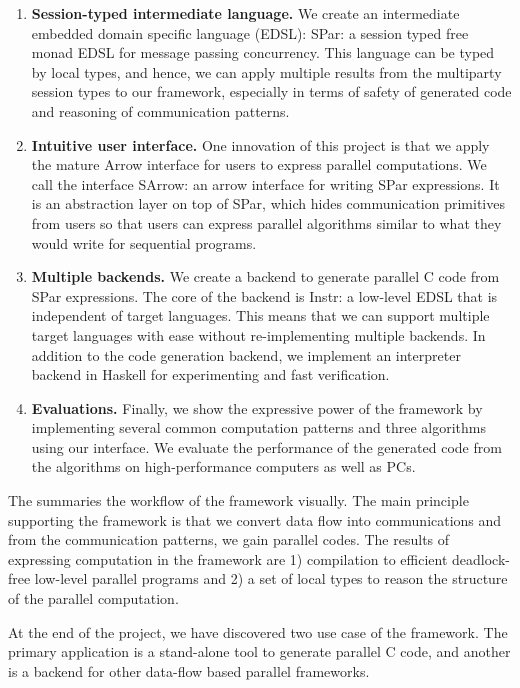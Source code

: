 \begin{enumerate}
    \item \textbf{Session-typed intermediate language. } We create an intermediate embedded domain specific language (EDSL): SPar: a session typed free monad EDSL for message passing concurrency. This language can be typed by local types, and hence, we can apply multiple results from the multiparty session types to our framework, especially in terms of safety of generated code and reasoning of communication patterns.
    \item \textbf{Intuitive user interface. } One innovation of this project is that we apply the mature Arrow interface for users to express parallel computations. We call the interface SArrow: an arrow interface for writing SPar expressions. It is an abstraction layer on top of SPar, which hides communication primitives from users so that users can express parallel algorithms similar to what they would write for sequential programs.
    \item \textbf{Multiple backends. } We create a backend to generate parallel C code from SPar expressions. The core of the backend is Instr: a low-level EDSL that is independent of target languages. This means that we can support multiple target languages with ease without re-implementing multiple backends. In addition to the code generation backend, we implement an interpreter backend in Haskell for experimenting and fast verification.
    \item \textbf{Evaluations. } Finally, we show the expressive power of the framework by implementing several common computation patterns and three algorithms using our interface. We evaluate the performance of the generated code from the algorithms on high-performance computers as well as PCs. 
\end{enumerate}
The  summaries the workflow of the framework visually. The main principle supporting the framework is that we convert data flow into communications and from the communication patterns, we gain parallel codes. The results of expressing computation in the framework are 1) compilation to efficient deadlock-free low-level parallel programs and 2) a set of local types to reason the structure of the parallel computation.

At the end of the project, we have discovered two use case of the framework. The primary application is a stand-alone tool to generate parallel C code, and another is a backend for other data-flow based parallel frameworks. 

